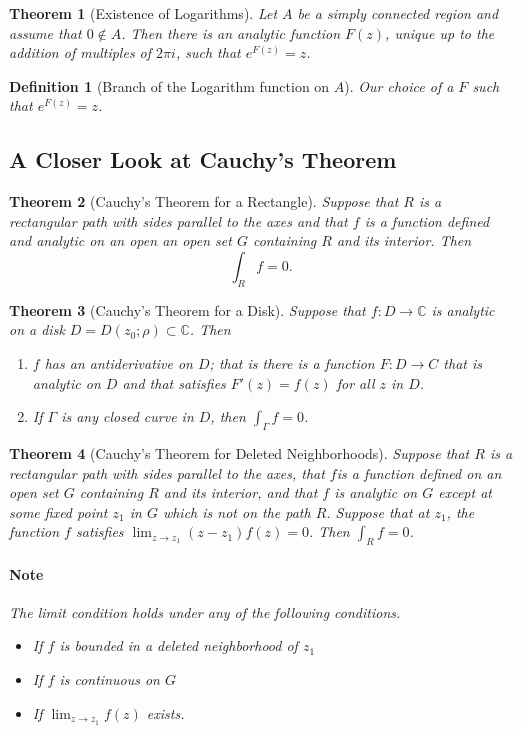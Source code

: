 \documentclass[a4paper]{article}
\newtheorem{definition}{Definition}
\newtheorem{theorem}{Theorem}
\newcommand{\C}{\mathbb{C}}
\begin{document}
\begin{theorem}[Existence of Logarithms]
  Let \(A\) be a simply connected region and assume that \(0 \not \in A\).
  Then there is an analytic function \(F(z)\), unique up to the addition of multiples of \(2 \pi i\), such that \(e^{F(z)} = z\).
\end{theorem}

\begin{definition}[Branch of the Logarithm function on \(A\)]
  Our choice of a \(F\) such that \(e^{F(z)} = z\).
\end{definition}


\subsection{A Closer Look at Cauchy's Theorem}

\begin{theorem}[Cauchy's Theorem for a Rectangle]
  Suppose that \(R\) is a rectangular path with sides parallel to the axes and that \(f\)  is a function defined and analytic on an open an open set \(G\) containing \(R\) and its interior.
  Then 
  \[\int_R f = 0.\]

\end{theorem}

\begin{theorem}[Cauchy's Theorem for a Disk]
  Suppose that \(f : D \to \C\) is analytic on a disk \(D = D(z_0; \rho) \subset \C\).
  Then
  \begin{enumerate}
    \item \(f\) has an antiderivative on \(D\); that is there is a function \(F : D \to C\) that is analytic on \(D\) and that satisfies \(F'(z) = f(z)\) for all \(z\) in \(D\).
    \item If \(\Gamma\) is any closed curve in \(D\), then \(\int_\Gamma f = 0\).
  \end{enumerate}

\end{theorem}

\begin{theorem}[Cauchy's Theorem for Deleted Neighborhoods]
  Suppose that \(R\) is a rectangular path with sides parallel to the axes, that \(f\)is a function defined on an open set  \(G\) containing \(R\) and its interior, and that \(f\) is analytic on \(G\) except at some fixed point \(z_1\) in \(G\) which is not on the path \(R\). 
  Suppose that at \(z_1\), the function \(f\) satisfies \(\lim_{z \to z_1} (z - z_1) f(z) = 0 \). 
  Then \(\int_R f = 0\).

  \paragraph{Note}
  The limit condition holds under any of the following conditions.
  \begin{itemize}
    \item If \(f\) is bounded in a deleted neighborhood of \(z_1\)
    \item If \(f\) is continuous on  \(G\)
    \item If \(\lim_{z \to z_1} f(z)\) exists. 
  \end{itemize}
\end{theorem}
\end{document}
